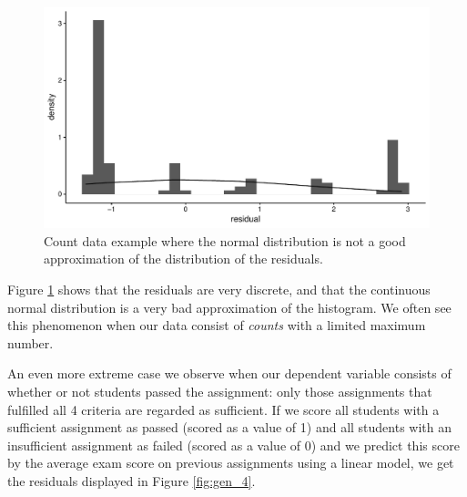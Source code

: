 \documentclass[]{book}\usepackage[]{graphicx}\usepackage[]{color}
\makeatletter
\def\maxwidth{ %
  \ifdim\Gin@nat@width>\linewidth
    \linewidth
  \else
    \Gin@nat@width
  \fi
}
\newenvironment{knitrout}{}{} %
\makeatother
\begin{document}
\begin{knitrout}
\color{fgcolor}\begin{figure}

{\centering \includegraphics[width=\maxwidth]{figure/gen_3-1} 

}

\caption[Count data example where the normal distribution is not a good approximation of the distribution of the residuals]{Count data example where the normal distribution is not a good approximation of the distribution of the residuals.}\label{fig:gen_3}
\end{figure}


\end{knitrout}


Figure \ref{fig:gen_3} shows that the residuals are very discrete, and that the continuous normal distribution is a very bad approximation of the histogram. We often see this phenomenon when our data consist of \textit{counts} with a limited maximum number.

An even more extreme case we observe when our dependent variable consists of whether or not students passed the assignment: only those assignments that fulfilled all 4 criteria are regarded as sufficient. If we score all students with a sufficient assignment as passed (scored as a value of 1) and all students with an insufficient assignment as failed (scored as a value of 0) and we predict this score by the average exam score on previous assignments using a linear model, we get the residuals displayed in Figure \ref{fig:gen_4}.
\end{document}
